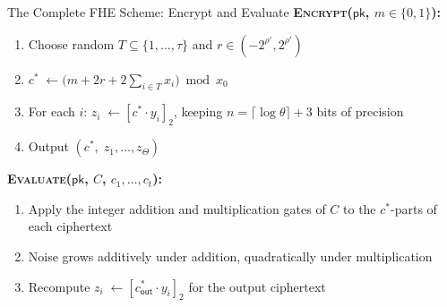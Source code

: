 \documentclass[10pt]{beamer}
\begin{document}
\begin{frame}{The Complete FHE Scheme: Encrypt and Evaluate}
    \textbf{\textsc{Encrypt}($\mathsf{pk}$,\; $m \in \{0,1\}$):}
    \begin{enumerate}
        \item Choose random $T \subseteq \{1,\ldots,\tau\}$
              and $r \in (-2^{\rho'}, 2^{\rho'})$
        \item $c^* \;\leftarrow \bigl(m + 2r + 2\sum_{i\in T} x_i\bigr)
              \bmod x_0$
        \item For each $i$:\; $z_i \;\leftarrow [c^* \cdot y_i]_2$,
              keeping $n = \lceil\log\theta\rceil + 3$ bits of precision
        \item Output $(c^*,\; z_1, \ldots, z_\Theta)$
    \end{enumerate}

    \vspace{0.4cm}
    \textbf{\textsc{Evaluate}($\mathsf{pk}$,\; $C$,\; $c_1,\ldots,c_t$):}
    \begin{enumerate}
        \item Apply the integer addition and multiplication gates of $C$
              to the $c^*$-parts of each ciphertext
        \item Noise grows additively under addition, quadratically under
              multiplication
        \item Recompute $z_i \;\leftarrow [c^*_\mathsf{out} \cdot y_i]_2$
              for the output ciphertext
    \end{enumerate}
\end{frame}
\end{document}
